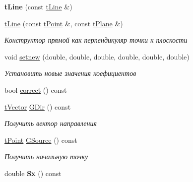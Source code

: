 \begin{DoxyCompactItemize}
\mbox{\label{classtLine_a2154dba6e6089dcbb6c3a61a10bb76c1}} 
{\bfseries t\+Line} (const \hyperlink{classtLine}{t\+Line} \&)
\item 
\mbox{\label{classtLine_a42c5470a9e40032639b6f22c82f90d9d}} 
\hyperlink{classtLine_a42c5470a9e40032639b6f22c82f90d9d}{t\+Line} (const \hyperlink{classtPoint}{t\+Point} \&, const \hyperlink{classtPlane}{t\+Plane} \&)
\begin{DoxyCompactList}\small\item\em Конструктор прямой как перпендикуляр точки к плоскости \end{DoxyCompactList}\item 
\mbox{\label{classtLine_ad74c8cba60f8719f6cfaaf7bb86933bc}} 
void \hyperlink{classtLine_ad74c8cba60f8719f6cfaaf7bb86933bc}{setnew} (double, double, double, double, double, double)
\begin{DoxyCompactList}\small\item\em Установить новые значения коефициентов \end{DoxyCompactList}\item 
bool \hyperlink{classtLine_aa824b319e4aa173d221ff28f55ec1890}{correct} () const
\item 
\mbox{\label{classtLine_ae24e73371453cca328317f2512d9a53e}} 
\hyperlink{classtVector}{t\+Vector} \hyperlink{classtLine_ae24e73371453cca328317f2512d9a53e}{G\+Dir} () const
\begin{DoxyCompactList}\small\item\em Получить вектор направления \end{DoxyCompactList}\item 
\mbox{\label{classtLine_aa2b2ab0dd465f2a824860b1f7211be1e}} 
\hyperlink{classtPoint}{t\+Point} \hyperlink{classtLine_aa2b2ab0dd465f2a824860b1f7211be1e}{G\+Source} () const
\begin{DoxyCompactList}\small\item\em Получить начальную точку \end{DoxyCompactList}\item 
\mbox{\label{classtLine_aab7ebec6bd8c0b93343b2410c96e4f72}} 
double {\bfseries Sx} () const
\item 
\mbox{\label{classtLine_a7d663774fd202f5aac5b7f8b2b0df4e7}} 

\end{DoxyCompactItemize}
